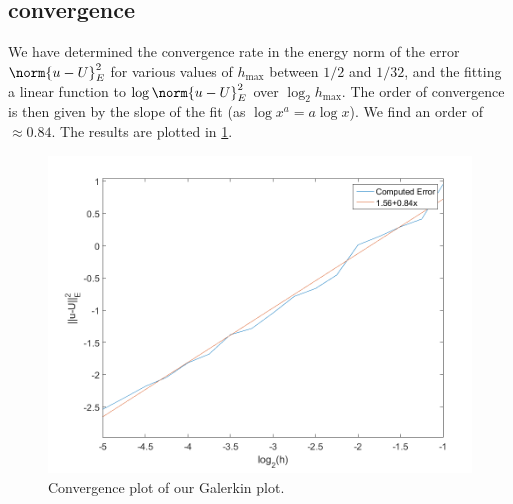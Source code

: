 \subsection{convergence}
We have determined the convergence rate in the energy norm of the error $\norm{u-U}_E^2$  for various values of $h_\text{max}$  between $1/2$ and $1/32$, and the fitting a linear function to $\log \norm{u-U}_E^2$ over $\log_2 h_\text{max}$. The order of convergence is then given by the slope of the fit (as $\log x^a = a\log x$). We find an order of $\approx 0.84$. The results are plotted in \ref{fig:1_convergence}.
\begin{figure}[!Hh]
  \centering
  \includegraphics[width=\textwidth]{./plots/01_convergence}
  \caption{Convergence plot of our Galerkin plot.}
  \label{fig:1_convergence}
\end{figure}

\newpage
\section{}
